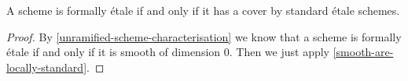 \begin{corollary}
A scheme is formally étale if and only if it has a cover by standard étale schemes.
\end{corollary}

\begin{proof}
By \cref{unramified-scheme-characterisation} we know that a scheme is formally étale if and only if it is smooth of dimension $0$. Then we just apply \cref{smooth-are-locally-standard}.
\end{proof}
